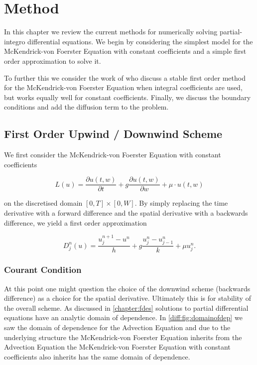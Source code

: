 \documentclass[../main.tex]{subfiles}
\begin{document}
  \chapter{Method}\label{chapter:method}

  In this chapter we review the current methods for numerically solving partial-integro differential equations. We begin by considering the simplest model for the McKendrick-von Foerster Equation with constant coefficients and a simple first order approximation to solve it.

  To further this we consider the work of \cite{hartvig2011} who discuss a stable first order method for the McKendrick-von Foerster Equation when integral coefficients are used, but works equally well for constant coefficients. Finally, we discuss the boundary conditions and add the diffusion term to the problem.

  \section{First Order Upwind / Downwind Scheme}
  We first consider the McKendrick-von Foerster Equation with constant coefficients

  \begin{equation}
    L(u) = \frac{\partial u(t, w)}{\partial t} + g \frac{\partial u(t, w)}{\partial w} + \mu \cdot u(t, w)
  \end{equation}

  on the discretised domain $[0, T] \times [0, W]$. By simply replacing the time derivative with a forward difference and the spatial derivative with a backwards difference, we yield a first order approximation

  \begin{equation}
    D^n_j(u) = \frac{u^{n+1}_j - u^n}{h} + g \frac{u^n_{j} - u^n_{j-1}}{k} + \mu u^n_j.
  \end{equation}

  \subsection{Courant Condition} \label{method:sec:courant}
  At this point one might question the choice of the downwind scheme (backwards difference) as a choice for the spatial derivative. Ultimately this is for stability of the overall scheme. As discussed in \autoref{chapter:fdes} solutions to partial differential equations have an analytic domain of dependence. In \autoref{diff:fig:domainofdep} we saw the domain of dependence for the Advection Equation and due to the underlying structure the McKendrick-von Foerster Equation inherits from the Advection Equation the McKendrick-von Foerster Equation with constant coefficients also inherits has the same domain of dependence.
\end{document}
